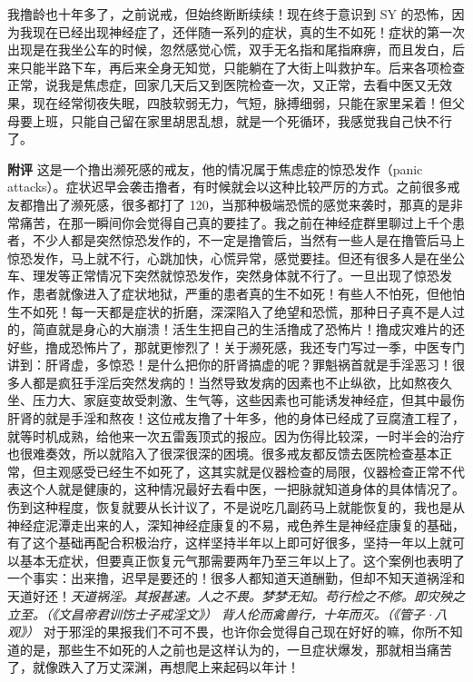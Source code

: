 \begin{case}
    我撸龄也十年多了，之前说戒，但始终断断续续！现在终于意识到 SY 的恐怖，因为我现在已经出现神经症了，还伴随一系列的症状，真的生不如死！症状的第一次出现是在我坐公车的时候，忽然感觉心慌，双手无名指和尾指麻痹，而且发白，后来只能半路下车，再后来全身无知觉，只能躺在了大街上叫救护车。后来各项检查正常，说我是焦虑症，回家几天后又到医院检查一次，又正常，去看中医又无效果，现在经常彻夜失眠，四肢软弱无力，气短，脉搏细弱，只能在家里呆着！但父母要上班，只能自己留在家里胡思乱想，就是一个死循环，我感觉我自己快不行了。

    \textbf{附评} 这是一个撸出濒死感的戒友，他的情况属于焦虑症的惊恐发作（panic attacks）。症状迟早会袭击撸者，有时候就会以这种比较严厉的方式。之前很多戒友都撸出了濒死感，很多都打了 120，当那种极端恐慌的感觉来袭时，那真的是非常痛苦，在那一瞬间你会觉得自己真的要挂了。我之前在神经症群里聊过上千个患者，不少人都是突然惊恐发作的，不一定是撸管后，当然有一些人是在撸管后马上惊恐发作，马上就不行，心跳加快，心慌异常，感觉要挂。但还有很多人是在坐公车、理发等正常情况下突然就惊恐发作，突然身体就不行了。一旦出现了惊恐发作，患者就像进入了症状地狱，严重的患者真的生不如死！有些人不怕死，但他怕生不如死！每一天都是症状的折磨，深深陷入了绝望和恐慌，那种日子真不是人过的，简直就是身心的大崩溃！活生生把自己的生活撸成了恐怖片！撸成灾难片的还好些，撸成恐怖片了，那就更惨烈了！关于濒死感，我还专门写过一季，中医专门讲到：肝肾虚，多惊恐！是什么把你的肝肾搞虚的呢？罪魁祸首就是手淫恶习！很多人都是疯狂手淫后突然发病的！当然导致发病的因素也不止纵欲，比如熬夜久坐、压力大、家庭变故受刺激、生气等，这些因素也可能诱发神经症，但其中最伤肝肾的就是手淫和熬夜！这位戒友撸了十年多，他的身体已经成了豆腐渣工程了，就等时机成熟，给他来一次五雷轰顶式的报应。因为伤得比较深，一时半会的治疗也很难奏效，所以就陷入了很深很深的困境。很多戒友都反馈去医院检查基本正常，但主观感受已经生不如死了，这其实就是仪器检查的局限，仪器检查正常不代表这个人就是健康的，这种情况最好去看中医，一把脉就知道身体的具体情况了。伤到这种程度，恢复就要从长计议了，不是说吃几副药马上就能恢复的，我也是从神经症泥潭走出来的人，深知神经症康复的不易，戒色养生是神经症康复的基础，有了这个基础再配合积极治疗，这样坚持半年以上即可好很多，坚持一年以上就可以基本无症状，但要真正恢复元气那需要两年乃至三年以上了。这个案例也表明了一个事实：出来撸，迟早是要还的！很多人都知道天道酬勤，但却不知天道祸淫和天道好还！\textit{天道祸淫。其报甚速。人之不畏。梦梦无知。苟行检之不修。即灾殃之立至。（《文昌帝君训饬士子戒淫文》）} \textit{背人伦而禽兽行，十年而灭。（《管子·八观》）} 对于邪淫的果报我们不可不畏，也许你会觉得自己现在好好的嘛，你所不知道的是，那些生不如死的人之前也是这样认为的，一旦症状爆发，那就相当痛苦了，就像跌入了万丈深渊，再想爬上来起码以年计！
\end{case}

